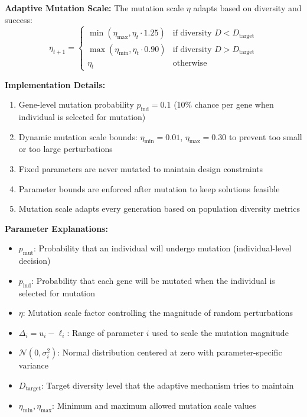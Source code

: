 \documentclass[12pt,a4paper]{article}
\begin{document}
\textbf{Adaptive Mutation Scale:}
The mutation scale $\eta$ adapts based on diversity and success:
\begin{equation}
\eta_{t+1} = \begin{cases}
\min(\eta_{\max}, \eta_t \cdot 1.25) & \text{if diversity } D < D_{\text{target}} \\
\max(\eta_{\min}, \eta_t \cdot 0.90) & \text{if diversity } D > D_{\text{target}} \\
\eta_t & \text{otherwise}
\end{cases} \label{eq:adaptive_mutation_scale}
\end{equation}

\textbf{Implementation Details:}
\begin{enumerate}
\item Gene-level mutation probability $p_{\text{ind}} = 0.1$ (10\% chance per gene when individual is selected for mutation)
\item Dynamic mutation scale bounds: $\eta_{\min} = 0.01$, $\eta_{\max} = 0.30$ to prevent too small or too large perturbations
\item Fixed parameters are never mutated to maintain design constraints
\item Parameter bounds are enforced after mutation to keep solutions feasible
\item Mutation scale adapts every generation based on population diversity metrics
\end{enumerate}

\textbf{Parameter Explanations:}
\begin{itemize}
\item $p_{\text{mut}}$: Probability that an individual will undergo mutation (individual-level decision)
\item $p_{\text{ind}}$: Probability that each gene will be mutated when the individual is selected for mutation
\item $\eta$: Mutation scale factor controlling the magnitude of random perturbations
\item $\Delta_i = u_i - \ell_i$: Range of parameter $i$ used to scale the mutation magnitude
\item $\mathcal{N}(0, \sigma_i^2)$: Normal distribution centered at zero with parameter-specific variance
\item $D_{\text{target}}$: Target diversity level that the adaptive mechanism tries to maintain
\item $\eta_{\min}, \eta_{\max}$: Minimum and maximum allowed mutation scale values
\end{itemize}
\end{document}
